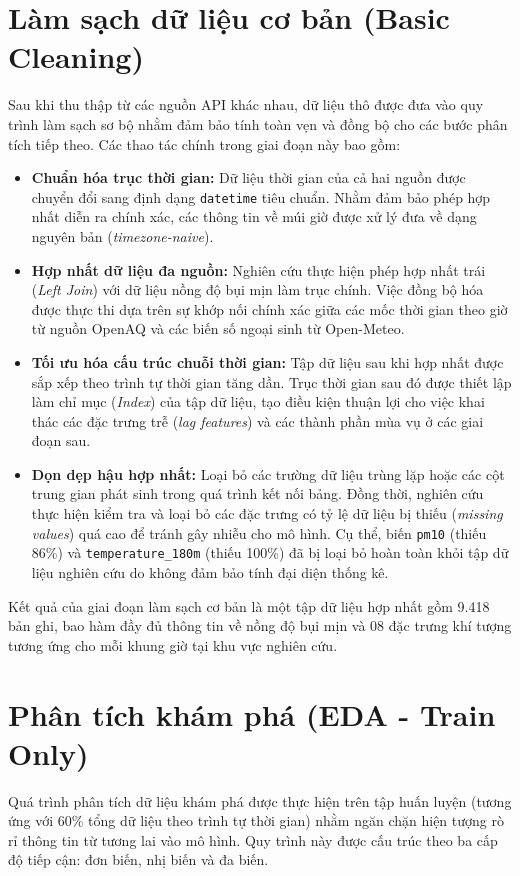 \section{Làm sạch dữ liệu cơ bản (Basic Cleaning)}
Sau khi thu thập từ các nguồn API khác nhau, dữ liệu thô được đưa vào quy trình làm sạch sơ bộ nhằm đảm bảo tính toàn vẹn và đồng bộ cho các bước phân tích tiếp theo. Các thao tác chính trong giai đoạn này bao gồm:
\begin{itemize}
    \item \textbf{Chuẩn hóa trục thời gian:} Dữ liệu thời gian của cả hai nguồn được chuyển đổi sang định dạng \texttt{datetime} tiêu chuẩn. Nhằm đảm bảo phép hợp nhất diễn ra chính xác, các thông tin về múi giờ được xử lý đưa về dạng nguyên bản (\textit{timezone-naive}).
    \item \textbf{Hợp nhất dữ liệu đa nguồn:} Nghiên cứu thực hiện phép hợp nhất trái (\textit{Left Join}) với dữ liệu nồng độ bụi mịn làm trục chính. Việc đồng bộ hóa được thực thi dựa trên sự khớp nối chính xác giữa các mốc thời gian theo giờ từ nguồn OpenAQ và các biến số ngoại sinh từ Open-Meteo.
    \item \textbf{Tối ưu hóa cấu trúc chuỗi thời gian:} Tập dữ liệu sau khi hợp nhất được sắp xếp theo trình tự thời gian tăng dần. Trục thời gian sau đó được thiết lập làm chỉ mục (\textit{Index}) của tập dữ liệu, tạo điều kiện thuận lợi cho việc khai thác các đặc trưng trễ (\textit{lag features}) và các thành phần mùa vụ ở các giai đoạn sau.
    \item \textbf{Dọn dẹp hậu hợp nhất:} Loại bỏ các trường dữ liệu trùng lặp hoặc các cột trung gian phát sinh trong quá trình kết nối bảng. Đồng thời, nghiên cứu thực hiện kiểm tra và loại bỏ các đặc trưng có tỷ lệ dữ liệu bị thiếu (\textit{missing values}) quá cao để tránh gây nhiễu cho mô hình. Cụ thể, biến \texttt{pm10} (thiếu 86\%) và \texttt{temperature\_180m} (thiếu 100\%) đã bị loại bỏ hoàn toàn khỏi tập dữ liệu nghiên cứu do không đảm bảo tính đại diện thống kê.
\end{itemize}
Kết quả của giai đoạn làm sạch cơ bản là một tập dữ liệu hợp nhất gồm 9.418 bản ghi, bao hàm đầy đủ thông tin về nồng độ bụi mịn và 08 đặc trưng khí tượng tương ứng cho mỗi khung giờ tại khu vực nghiên cứu.

\section{Phân tích khám phá (EDA - Train Only)}
Quá trình phân tích dữ liệu khám phá được thực hiện trên tập huấn luyện (tương ứng với 60\% tổng dữ liệu theo trình tự thời gian) nhằm ngăn chặn hiện tượng rò rỉ thông tin từ tương lai vào mô hình. Quy trình này được cấu trúc theo ba cấp độ tiếp cận: đơn biến, nhị biến và đa biến.
